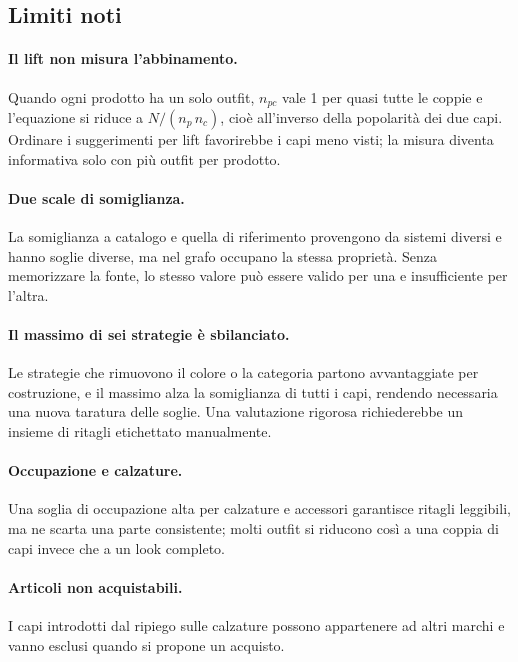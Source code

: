 \newpage

\subsection{Limiti noti}

\paragraph{Il lift non misura l'abbinamento.}
Quando ogni prodotto ha un solo outfit, $n_{pc}$ vale 1 per quasi tutte le coppie e l'equazione si riduce a $N / (n_p\,n_c)$, cioè all'inverso della popolarità dei due capi. Ordinare i suggerimenti per lift favorirebbe i capi meno visti; la misura diventa informativa solo con più outfit per prodotto.

\paragraph{Due scale di somiglianza.}
La somiglianza a catalogo e quella di riferimento provengono da sistemi diversi e hanno soglie diverse, ma nel grafo occupano la stessa proprietà. Senza memorizzare la fonte, lo stesso valore può essere valido per una e insufficiente per l'altra.

\paragraph{Il massimo di sei strategie è sbilanciato.}
Le strategie che rimuovono il colore o la categoria partono avvantaggiate per costruzione, e il massimo alza la somiglianza di tutti i capi, rendendo necessaria una nuova taratura delle soglie. Una valutazione rigorosa richiederebbe un insieme di ritagli etichettato manualmente.

\paragraph{Occupazione e calzature.}
Una soglia di occupazione alta per calzature e accessori garantisce ritagli leggibili, ma ne scarta una parte
consistente; molti outfit si riducono così a una coppia di capi invece che a un look completo.

\paragraph{Articoli non acquistabili.}
I capi introdotti dal ripiego sulle calzature possono appartenere ad altri marchi e vanno esclusi quando si propone un acquisto.

\newpage
